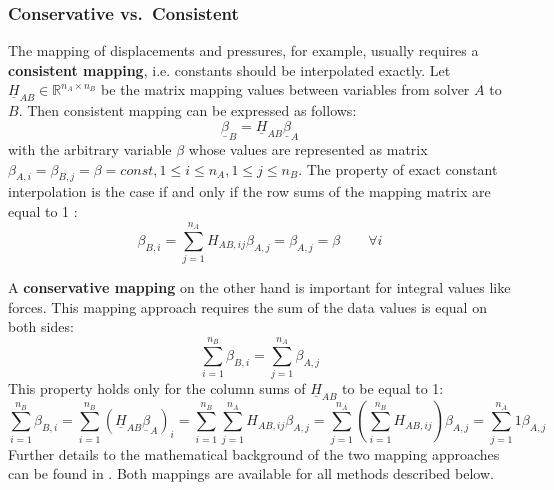   \subsubsection{Conservative vs.\ Consistent}\label{sec:Coupl-DataMapping-conVScon}
   The mapping of displacements and pressures, for example, usually requires a \textbf{consistent mapping}, i.e. constants should be interpolated exactly. Let $\underline{H}_{AB} \in \mathbb{R}^{n_A \times n_B}$ be the matrix mapping values between variables from solver $A$ to $B$. Then consistent mapping can be expressed as follows:
   \begin{equation}
   \underline{\beta}_B = \underline{H}_{AB} \underline{\beta}_A
   \end{equation}
   with the arbitrary variable $\beta$ whose values are represented as matrix $\beta_{A,i} = \beta_{B,j} = \beta = const, 1 \leq i \leq n_A, 1 \leq j \leq n_B$. The property of exact constant interpolation is the case if and only if the row sums of the mapping matrix are equal to 1 \cite{gatzhammer2015efficient}:
   \begin{equation}
   \beta_{B,i} = \sum_{j=1}^{n_A} H_{AB,ij}\beta_{A,j} = \beta_{A,j} = \beta \qquad \forall i
   \end{equation}
   
   A \textbf{conservative mapping} on the other hand is important for integral values like forces. This mapping approach requires the sum of the data values is equal on both sides:
   \begin{equation}
   \sum_{i=1}^{n_B}\beta_{B,i} = \sum_{j=1}^{n_A}\beta_{A,j}
   \end{equation}
   This property holds only for the column sums of $\underline{H}_{AB}$ to be equal to 1:
   \begin{equation}
   \sum_{i=1}^{n_B}\beta_{B,i} = \sum_{i=1}^{n_B}\left( \underline{H}_{AB}\underline{\beta}_A \right)_i = \sum_{i=1}^{n_B}\sum_{j=1}^{n_A} H_{AB,ij}\beta_{A,j} = \sum_{j=1}^{n_A}\left( \sum_{i=1}^{n_B} H_{AB,ij}\right) \beta_{A,j} = \sum_{j=1}^{n_A} 1 \beta_{A,j}
   \end{equation}
   Further details to the mathematical background of the two mapping approaches can be found in \cite{gatzhammer2015efficient}. Both mappings are available for all methods described below.

